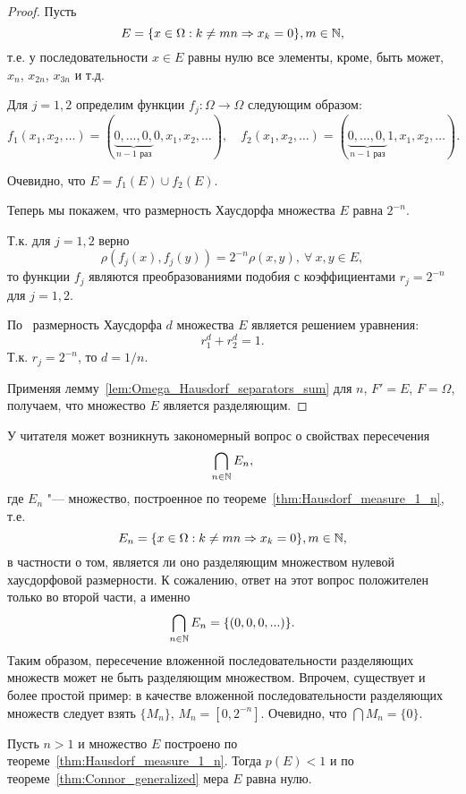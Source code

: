 \begin{proof}
	Пусть
	\begin{equation}
		E= \{ x \in \Omega : k \neq mn \Rightarrow x_k = 0\}, m\in \mathbb{N}
		,
	\end{equation}
	т.е. у последовательности $x \in E$ равны нулю все элементы, кроме, быть может, $x_n$, $x_{2n}$, $x_{3n}$ и т.д.

	Для $j=1,2$ определим функции $f_j : \Omega \to \Omega$ следующим образом:
	\begin{equation}
		f_1(x_1, x_2, \dots)=(\underbrace{0, ..., 0,}_{\mbox{$n-1$ раз}} 0, x_1, x_2, \dots)
		,
		\quad
		f_2(x_1, x_2, \dots)=(\underbrace{0, ..., 0,}_{\mbox{$n-1$ раз}} 1, x_1, x_2, \dots)
		.
	\end{equation}

	Очевидно, что $E=f_1(E)\cup f_2(E).$

	Теперь мы покажем, что размерность Хаусдорфа множества $E$ равна $2^{-n}$.

	Т.к. для $j=1,2$ верно
	 $$\rho(f_j(x),f_j(y))=2^{-n}\rho(x,y), \ \forall \ x, y \in E,$$
	 то функции $f_j$ являются преобразованиями подобия с коэффициентами $r_j=2^{-n}$ для $j=1,2$.


	По~\cite[Теорема 9.3]{Edgar} размерность Хаусдорфа $d$ множества $E$ является решением уравнения:
	$$ r_1^d+r_2^d=1.$$
	Т.к. $r_j=2^{-n}$, то
	$d=1/n.$

	Применяя лемму~\ref{lem:Omega_Hausdorf_separators_sum}
	для $n$, $F'=E$, $F=\Omega$, получаем, что множество $E$ является разделяющим.
\end{proof}

\begin{remark}
	У читателя может возникнуть закономерный вопрос о свойствах пересечения
	\begin{equation}
		\bigcap_{n\in \mathbb{N}} E_{n}
		,
	\end{equation}
	где $E_n$ "--- множество, построенное по теореме~\ref{thm:Hausdorf_measure_1_n}, т.е.
	\begin{equation}
		E_n = \{ x \in \Omega : k \neq mn \Rightarrow x_k = 0\}, m\in \mathbb{N}
		,
	\end{equation}
	в частности о том, является ли оно разделяющим множеством нулевой хаусдорфовой размерности.
	К сожалению, ответ на этот вопрос положителен только во второй части, а именно
	\begin{equation}
		\bigcap_{n\in \mathbb{N}} E_n = \{(0,0,0,...)\}
		.
	\end{equation}
	Таким образом, пересечение вложенной последовательности разделяющих множеств может не быть разделяющим множеством.
	Впрочем, существует и более простой пример:
	в качестве вложенной последовательности разделяющих множеств следует взять $\{M_n\}$, $M_n = [0, 2^{-n}]$.
	Очевидно, что $\bigcap\limits M_n = \{0\}$.
\end{remark}


\begin{remark}
	Пусть $n>1$ и множество $E$ построено по теореме~\ref{thm:Hausdorf_measure_1_n}.
	Тогда $p(E)< 1$ и по теореме~\ref{thm:Connor_generalized} мера $E$ равна нулю.
\end{remark}
